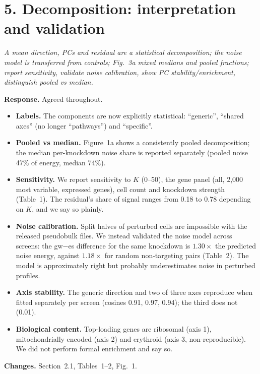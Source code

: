 \documentclass[10pt]{article}
\newenvironment{rev}{\par\medskip\noindent\color{black!70}\itshape}{\par}
\newcommand{\resp}{\par\smallskip\noindent\textbf{Response.} }
\newcommand{\chg}{\par\smallskip\noindent\textbf{Changes.} }
\begin{document}
\section*{5. Decomposition: interpretation and validation}
\begin{rev}A mean direction, PCs and residual are a statistical decomposition; the noise model is transferred from controls; Fig.~3a mixed medians and pooled fractions; report sensitivity, validate noise calibration, show PC stability/enrichment, distinguish pooled vs median.\end{rev}
\resp Agreed throughout.
\begin{itemize}
\item \textbf{Labels.} The components are now explicitly statistical: ``generic'', ``shared axes'' (no longer ``pathways'') and ``specific''.
\item \textbf{Pooled vs median.} Figure~1a shows a consistently pooled decomposition; the median per-knockdown noise share is reported separately (pooled noise 47\% of energy, median 74\%).
\item \textbf{Sensitivity.} We report sensitivity to $K$ (0--50), the gene panel (all, 2{,}000 most variable, expressed genes), cell count and knockdown strength (Table~1). The residual's share of signal ranges from 0.18 to 0.78 depending on $K$, and we say so plainly.
\item \textbf{Noise calibration.} Split halves of perturbed cells are impossible with the released pseudobulk files. We instead validated the noise model across screens: the gw$-$es difference for the same knockdown is $1.30\times$ the predicted noise energy, against $1.18\times$ for random non-targeting pairs (Table~2). The model is approximately right but probably underestimates noise in perturbed profiles.
\item \textbf{Axis stability.} The generic direction and two of three axes reproduce when fitted separately per screen (cosines 0.91, 0.97, 0.94); the third does not (0.01).
\item \textbf{Biological content.} Top-loading genes are ribosomal (axis 1), mitochondrially encoded (axis 2) and erythroid (axis 3, non-reproducible). We did not perform formal enrichment and say so.
\end{itemize}
\chg Section~2.1, Tables~1--2, Fig.~1.
\end{document}
